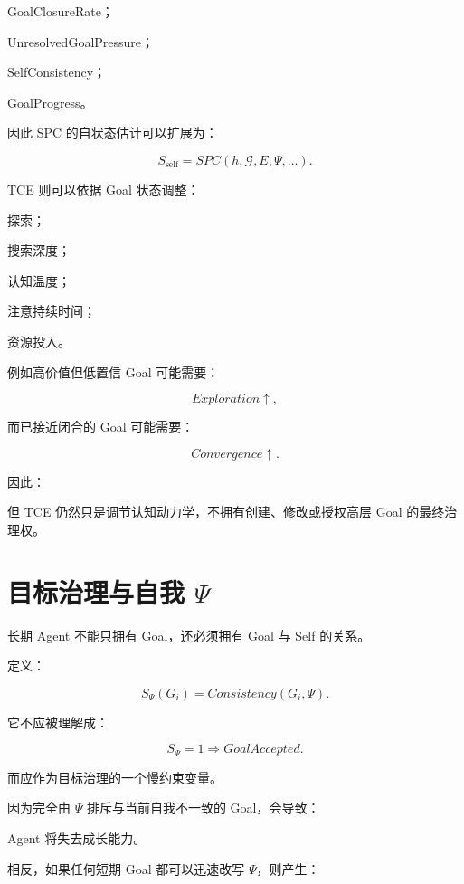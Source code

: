 GoalClosureRate；

UnresolvedGoalPressure；

SelfConsistency；

GoalProgress。

因此 SPC 的自状态估计可以扩展为：

\[
S_{\mathrm{self}}
=
SPC(
h,
\mathcal G,
E,
\Psi,
\ldots
).
\]

TCE 则可以依据 Goal 状态调整：

探索；

搜索深度；

认知温度；

注意持续时间；

资源投入。

例如高价值但低置信 Goal 可能需要：

\[
Exploration\uparrow,
\]

而已接近闭合的 Goal 可能需要：

\[
Convergence\uparrow.
\]

因此：

\begin{statementbox}
\centering
{}
\end{statementbox}

但 TCE 仍然只是调节认知动力学，不拥有创建、修改或授权高层 Goal 的最终治理权。


\section{目标治理与自我 $\Psi$}

长期 Agent 不能只拥有 Goal，还必须拥有 Goal 与 Self 的关系。

定义：

\[
S_\Psi(G_i)
=
Consistency(G_i,\Psi).
\]

它不应被理解成：

\[
S_\Psi=1
\Rightarrow
GoalAccepted.
\]

而应作为目标治理的一个慢约束变量。

因为完全由 $\Psi$ 排斥与当前自我不一致的 Goal，会导致：

\begin{statementbox}
\centering
{}
\end{statementbox}

Agent 将失去成长能力。

相反，如果任何短期 Goal 都可以迅速改写 $\Psi$，则产生：

